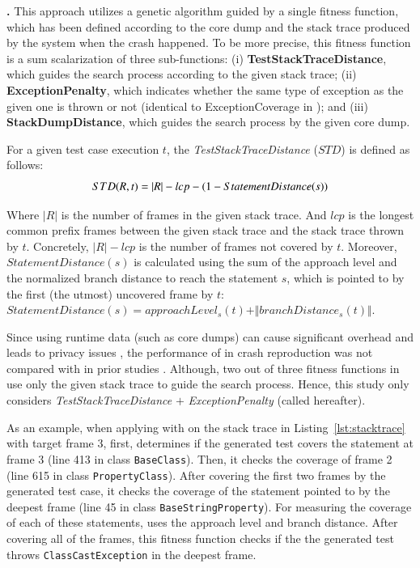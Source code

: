 \textbf{\recore.}
This approach utilizes a genetic algorithm guided by a single fitness function, which has been defined according to the core dump and the stack trace produced by the system when the crash happened. To be more precise,  this fitness function is a sum scalarization of three sub-functions: (i) \textbf{TestStackTraceDistance}, which guides the search process according to the given stack trace; (ii) \textbf{ExceptionPenalty}, which indicates whether the same type of exception as the given one is thrown or not (identical to ExceptionCoverage in \evocrash); and (iii) \textbf{StackDumpDistance}, which guides the search process by the given core dump. 
\begin{definition}
    For a given test case execution $t$, the \textit{TestStackTraceDistance} ($STD$) is defined as follows:
    \begin{equation}
    \small
    STD(R,t) = |R| - lcp - (1-StatementDistance(s))
     \end{equation}
\end{definition}
%
Where $|R|$ is the number of frames in the given stack trace. And $lcp$ is the longest common prefix frames between the given stack trace and the stack trace thrown by $t$. Concretely, $|R| - lcp$ is the number of frames not covered by $t$. Moreover, $StatementDistance(s)$ is calculated using the sum of the approach level and the normalized branch distance to reach the statement $s$, which is pointed to by the first (the utmost) uncovered frame by $t$: $StatementDistance(s) = approachLevel_{s}(t) + \Vert branchDistance_{s}(t) \Vert$.

Since using runtime data (such as core dumps) can cause significant overhead \cite{Chen2015} and leads to privacy issues \cite{nayrolles2015jcharming}, the performance of \recore in crash reproduction was not compared with \evocrash in prior studies \cite{Soltani2018a}.
Although, two out of three fitness functions in \recore use only the given stack trace to guide the search process. Hence, this study only considers \textit{TestStackTraceDistance} $+$ \textit{ExceptionPenalty} (called \integ hereafter).

As an example, when applying \recore with \integ on the stack trace in Listing~\ref{lst:stacktrace} with target frame 3, first, \integ determines if the generated test covers the statement at frame 3 (line 413 in class \texttt{BaseClass}). Then, it checks the coverage of frame 2 (line 615 in class \texttt{PropertyClass}). After covering the first two frames by the generated test case, it checks the coverage of the statement pointed to by the deepest frame (line 45 in class \texttt{BaseStringProperty}). For measuring the coverage of each of these statements, \integ uses the approach level and branch distance. After covering all of the frames, this fitness function checks if the the generated test throws \texttt{ClassCastException} in the deepest frame.

